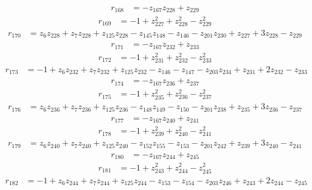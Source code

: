 \begin{align*}
r_{168} &= -z_{167}z_{228} + z_{229}
\end{align*}
\begin{align*}
r_{169} &= -1 + z_{227}^{2} + z_{228}^{2} - z_{229}^{2}
\end{align*}
\begin{align*}
r_{170} &= z_{6}z_{228} + z_{7}z_{228} + z_{125}z_{228} - z_{145}z_{148} - z_{146} - z_{201}z_{230} + z_{227} + 3z_{228} - z_{229}
\end{align*}
\begin{align*}
r_{171} &= -z_{167}z_{232} + z_{233}
\end{align*}
\begin{align*}
r_{172} &= -1 + z_{231}^{2} + z_{232}^{2} - z_{233}^{2}
\end{align*}
\begin{align*}
r_{173} &= -1 + z_{6}z_{232} + z_{7}z_{232} + z_{125}z_{232} - z_{146} - z_{147} - z_{203}z_{234} + z_{231} + 2z_{232} - z_{233}
\end{align*}
\begin{align*}
r_{174} &= -z_{167}z_{236} + z_{237}
\end{align*}
\begin{align*}
r_{175} &= -1 + z_{235}^{2} + z_{236}^{2} - z_{237}^{2}
\end{align*}
\begin{align*}
r_{176} &= z_{6}z_{236} + z_{7}z_{236} + z_{125}z_{236} - z_{148}z_{149} - z_{150} - z_{201}z_{238} + z_{235} + 3z_{236} - z_{237}
\end{align*}
\begin{align*}
r_{177} &= -z_{167}z_{240} + z_{241}
\end{align*}
\begin{align*}
r_{178} &= -1 + z_{239}^{2} + z_{240}^{2} - z_{241}^{2}
\end{align*}
\begin{align*}
r_{179} &= z_{6}z_{240} + z_{7}z_{240} + z_{125}z_{240} - z_{152}z_{155} - z_{153} - z_{201}z_{242} + z_{239} + 3z_{240} - z_{241}
\end{align*}
\begin{align*}
r_{180} &= -z_{167}z_{244} + z_{245}
\end{align*}
\begin{align*}
r_{181} &= -1 + z_{243}^{2} + z_{244}^{2} - z_{245}^{2}
\end{align*}
\begin{align*}
r_{182} &= -1 + z_{6}z_{244} + z_{7}z_{244} + z_{125}z_{244} - z_{153} - z_{154} - z_{203}z_{246} + z_{243} + 2z_{244} - z_{245}
\end{align*}
